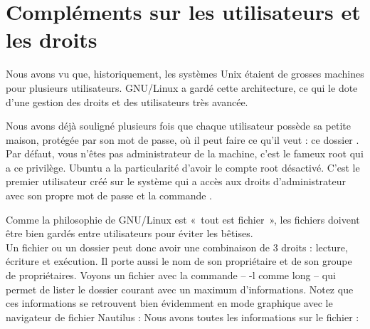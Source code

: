 \section{Compléments sur les utilisateurs et les droits}
Nous avons vu que, historiquement, les systèmes Unix étaient de grosses machines pour plusieurs utilisateurs. GNU/Linux a gardé cette architecture, ce qui le dote d'une gestion des droits et des utilisateurs très avancée.\par
Nous avons déjà souligné plusieurs fois que chaque utilisateur possède sa petite maison, protégée par son mot de passe, où il peut faire ce qu'il veut : ce dossier .\\
Par défaut, vous n'êtes pas administrateur de la machine, c'est le fameux root qui a ce privilège. Ubuntu a la particularité d'avoir le compte root désactivé. C'est le premier utilisateur créé sur le système qui a accès aux droits d'administrateur avec son propre mot de passe et la commande .\par
Comme la philosophie de GNU/Linux est «~tout est fichier~», les fichiers doivent être bien gardés entre utilisateurs pour éviter les bêtises.\\
Un fichier ou un dossier peut donc avoir une combinaison de 3 droits : lecture, écriture et exécution. Il porte aussi le nom de son propriétaire et de son groupe de propriétaires. Voyons un fichier avec la commande  -- -l comme long -- qui permet de lister le dossier courant avec un maximum d'informations. Notez que ces informations se retrouvent bien évidemment en mode graphique avec le navigateur de fichier Nautilus :
Nous avons toutes les informations sur le fichier :
